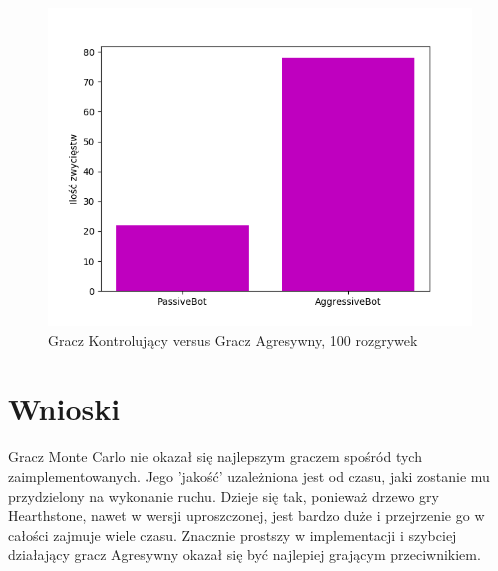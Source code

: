 \documentclass[a4paper, 12pt]{article}
\begin{document}
\begin{figure}[H]
	\centering
	\includegraphics[scale=0.75]{100_p_vs_a.png}
	\caption{Gracz Kontrolujący versus Gracz Agresywny, 100 rozgrywek}
\end{figure}

\section{Wnioski}
Gracz Monte Carlo nie okazał się najlepszym graczem spośród tych zaimplementowanych. Jego 'jakość' uzależniona jest od czasu, jaki zostanie mu przydzielony na wykonanie ruchu. Dzieje się tak, ponieważ drzewo gry Hearthstone, nawet w wersji uproszczonej, jest bardzo duże i przejrzenie go w całości zajmuje wiele czasu. Znacznie prostszy w implementacji i szybciej działający gracz Agresywny okazał się być najlepiej grającym przeciwnikiem.
\end{document}
